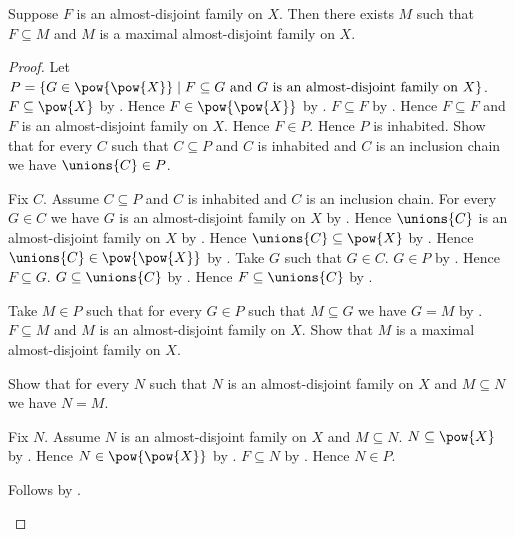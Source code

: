 \begin{theorem}\label{almost_disjoint_family_has_maximal_extension}
    Suppose $F$ is an almost-disjoint family on $X$.
    Then there exists $M$ such that
        $F\subseteq M$ and
        $M$ is a maximal almost-disjoint family on $X$.
\end{theorem}
\begin{proof}
    Let $P=\{G\in\pow{\pow{X}}\mid
        \text{$F\subseteq G$ and
            $G$ is an almost-disjoint family on $X$}\}$.
    $F\subseteq\pow{X}$ by .
    Hence $F\in\pow{\pow{X}}$ by .
    $F\subseteq F$ by .
    Hence $F\subseteq F$ and
        $F$ is an almost-disjoint family on $X$.
    Hence $F\in P$.
    Hence $P$ is inhabited.
    Show that for every $C$ such that $C\subseteq P$ and $C$ is inhabited
        and $C$ is an inclusion chain we have $\unions{C}\in P$.
    \begin{subproof}
        Fix $C$.
        Assume $C\subseteq P$ and $C$ is inhabited and
            $C$ is an inclusion chain.
        For every $G\in C$ we have
            $G$ is an almost-disjoint family on $X$
            by .
        Hence $\unions{C}$ is an almost-disjoint family on $X$
            by .
        Hence $\unions{C}\subseteq\pow{X}$
            by .
        Hence $\unions{C}\in\pow{\pow{X}}$
            by .
        Take $G$ such that $G\in C$.
        $G\in P$ by .
        Hence $F\subseteq G$.
        $G\subseteq\unions{C}$ by .
        Hence $F\subseteq\unions{C}$ by .
    \end{subproof}
    Take $M\in P$ such that for every $G\in P$ such that
        $M\subseteq G$ we have $G=M$ by .
    $F\subseteq M$ and
        $M$ is an almost-disjoint family on $X$.
    Show that $M$ is a maximal almost-disjoint family on $X$.
    \begin{subproof}
        Show that for every $N$ such that
            $N$ is an almost-disjoint family on $X$ and
            $M\subseteq N$ we have $N=M$.
        \begin{subproof}
            Fix $N$.
            Assume $N$ is an almost-disjoint family on $X$ and
                $M\subseteq N$.
            $N\subseteq\pow{X}$
                by .
            Hence $N\in\pow{\pow{X}}$ by .
            $F\subseteq N$ by .
            Hence $N\in P$.
        \end{subproof}
        Follows by .
    \end{subproof}
\end{proof}

